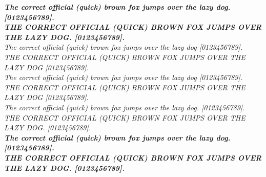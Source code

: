 \documentclass{PalisadesLakesArticle}
\begin{document}
\textit{\textbf{%
The correct official (quick) brown fox jumps over the lazy dog. [0123456789].\\
THE CORRECT OFFICIAL (QUICK) BROWN FOX JUMPS OVER THE LAZY DOG. [0123456789].\\ }}
\textit{}
\newpage
\textsl{%
The correct official (quick) brown fox jumps over the lazy dog [0123456789].\\
THE CORRECT OFFICIAL (QUICK) BROWN FOX JUMPS OVER THE LAZY DOG [0123456789].\\ }
\textsl{}
\textsl{}
\textsl{%
The correct official (quick) brown fox jumps over the lazy dog [0123456789].\\
THE CORRECT OFFICIAL (QUICK) BROWN FOX JUMPS OVER THE LAZY DOG [0123456789].\\ }
\textsl{\textmd{%
The correct official (quick) brown fox jumps over the lazy dog. [0123456789].\\
THE CORRECT OFFICIAL (QUICK) BROWN FOX JUMPS OVER THE LAZY DOG. [0123456789].\\ }}
\textsl{}
\textsl{\textbf{%
The correct official (quick) brown fox jumps over the lazy dog. [0123456789].\\
THE CORRECT OFFICIAL (QUICK) BROWN FOX JUMPS OVER THE LAZY DOG. [0123456789].\\ }}
\textsl{}
\newpage
\end{document}
